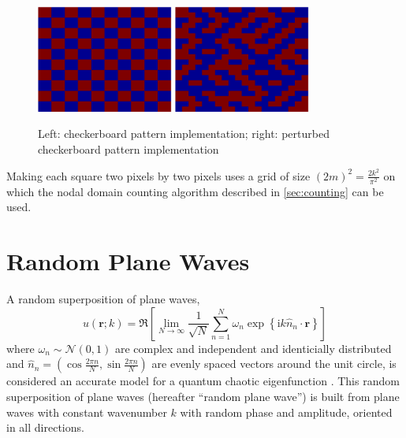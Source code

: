 \documentclass{report}
\newcommand{\rr}[0]{\mathbf{r}}
\begin{document}
\begin{figure}
  \begin{center}
    \includegraphics[width=0.4\textwidth]{figs/percolation/checkerboard_implementation.eps}
    \hspace{1 cm}
    \includegraphics[width=0.4\textwidth]{figs/percolation/perturbed_implementation.eps}
    \caption{Left: checkerboard pattern implementation; right: perturbed checkerboard pattern implementation}
    \label{fig:percolation_implementation}
  \end{center}
\end{figure}

Making each square two pixels by two pixels uses a grid of size $(2m)^{2} = \frac{2 k^{2}}{\pi^2}$ on which the nodal domain counting algorithm described in \ref{sec:counting} can be used.

\section{Random Plane Waves}
A random superposition of plane waves,
\begin{equation}
  \label{eq:rpw}
  u(\rr ; k) = \Re \left[ \lim_{N \rightarrow \infty} \frac{1}{\sqrt{N}} \sum_{n=1}^{N} \omega_{n} \exp{\left\{\mathrm{i} k \hat{n}_{n} \cdot \rr \right\}} \right]
\end{equation}
where $\omega_{n} \sim \mathcal{N}(0,1)$ are complex and independent and identicially distributed and $\hat{n}_{n} = (\cos \frac {2 \pi n}{N}, \sin \frac {2 \pi n}{N})$ are evenly spaced vectors around the unit circle, is considered an accurate model for a quantum chaotic eigenfunction \cite{heller}. This random superposition of plane waves (hereafter ``random plane wave'') is built from plane waves with constant wavenumber $k$ with random phase and amplitude, oriented in all directions.
\end{document}
